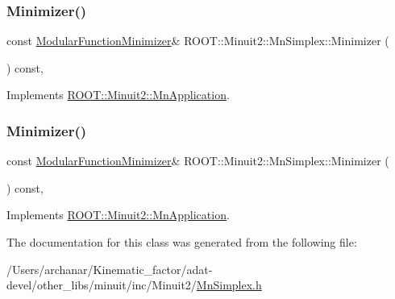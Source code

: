 \subsubsection{\texorpdfstring{Minimizer()}{Minimizer()}\hspace{0.1cm}{\footnotesize\ttfamily [2/3]}}
{\footnotesize\ttfamily const \mbox{\hyperlink{classROOT_1_1Minuit2_1_1ModularFunctionMinimizer}{Modular\+Function\+Minimizer}}\& R\+O\+O\+T\+::\+Minuit2\+::\+Mn\+Simplex\+::\+Minimizer (\begin{DoxyParamCaption}{ }\end{DoxyParamCaption}) const\hspace{0.3cm}{\ttfamily [inline]}, {\ttfamily [virtual]}}



Implements \mbox{\hyperlink{classROOT_1_1Minuit2_1_1MnApplication_a5a8e1e2658b731b5f4023dd1b1594223}{R\+O\+O\+T\+::\+Minuit2\+::\+Mn\+Application}}.

\mbox{\label{classROOT_1_1Minuit2_1_1MnSimplex_a8fa3495353e667d85e7dbeaffa94b94c}} 
\subsubsection{\texorpdfstring{Minimizer()}{Minimizer()}\hspace{0.1cm}{\footnotesize\ttfamily [3/3]}}
{\footnotesize\ttfamily const \mbox{\hyperlink{classROOT_1_1Minuit2_1_1ModularFunctionMinimizer}{Modular\+Function\+Minimizer}}\& R\+O\+O\+T\+::\+Minuit2\+::\+Mn\+Simplex\+::\+Minimizer (\begin{DoxyParamCaption}{ }\end{DoxyParamCaption}) const\hspace{0.3cm}{\ttfamily [inline]}, {\ttfamily [virtual]}}



Implements \mbox{\hyperlink{classROOT_1_1Minuit2_1_1MnApplication_a5a8e1e2658b731b5f4023dd1b1594223}{R\+O\+O\+T\+::\+Minuit2\+::\+Mn\+Application}}.



The documentation for this class was generated from the following file\+:\begin{DoxyCompactItemize}
\item 
/\+Users/archanar/\+Kinematic\+\_\+factor/adat-\/devel/other\+\_\+libs/minuit/inc/\+Minuit2/\mbox{\hyperlink{adat-devel_2other__libs_2minuit_2inc_2Minuit2_2MnSimplex_8h}{Mn\+Simplex.\+h}}\end{DoxyCompactItemize}
